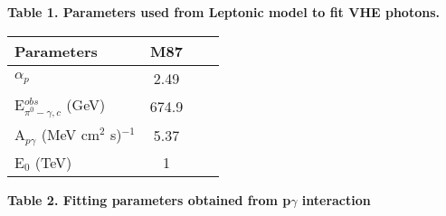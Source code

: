 \documentclass[preprint, twocolumn,secnumarabic,amssymb, nobibnotes, aps, prd]{revtex4-1}
\begin{document}
\begin{center}
\begin{tabular}{ l c c c }
 


 
\hline

\hline

 \end{tabular}
\end{center}

\begin{center}
\scriptsize{\textbf{Table 1. Parameters used from Leptonic model to fit VHE photons.}}\\
\scriptsize{}
\end{center}




\begin{center}\renewcommand{\arraystretch}{0.75}\addtolength{\tabcolsep}{-1pt}
\begin{tabular}{ l c c c }


\hline
\hline
\normalsize{Parameters} & \normalsize{M87} \\
\hline
\hline

\scriptsize{$\alpha_p$}  & \scriptsize{2.49}   \\
\scriptsize{E$^{obs}_{\pi^0-\gamma,c}$ (GeV)}  &\scriptsize{674.9}  \\
\scriptsize{A$_{p\gamma}$  (MeV cm$^2$ s)$^{-1}$ }   & \scriptsize{5.37}  \\
\scriptsize{E$_0$ (TeV)}   &\scriptsize{1}  \\

\hline
\hline

 \end{tabular}
\end{center}

\begin{center}
\scriptsize{\textbf{Table 2.  Fitting parameters obtained from  p$\gamma$ interaction}}\\
\scriptsize{ }
\end{center}
\end{document}
